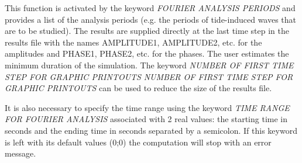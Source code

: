  This function is activated by the keyword \textit{FOURIER ANALYSIS PERIODS}  and provides a list of the analysis periods (e.g. the periods of tide-induced waves that are to be studied). The results are supplied directly at the last time step in the results file with the names AMPLITUDE1, AMPLITUDE2, etc. for the amplitudes and PHASE1, PHASE2, etc. for the phases. The user estimates the minimum duration of the simulation. The keyword \textit{NUMBER OF FIRST TIME STEP FOR GRAPHIC PRINTOUTS} \textit{NUMBER OF FIRST TIME STEP FOR GRAPHIC PRINTOUTS} can be used to reduce the size of the results file.

 It is also necessary to specify the time range using the keyword \textit{TIME RANGE FOR FOURIER ANALYSIS} associated with 2 real values: the starting time in seconds and the ending time in seconds separated by a semicolon. If this keyword is left with its default values (0;0) the computation will stop with an error message.


